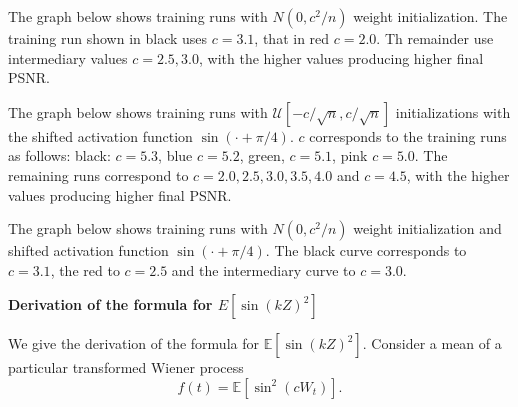 \documentclass{letter}
\begin{document}
\begin{center}

\end{center}

The graph below shows training runs with $N(0,c^2/n)$ weight initialization. The training run shown in black uses $c=3.1$, that in red $c=2.0$. Th remainder use intermediary values $c=2.5, 3.0$, with the higher values producing higher final PSNR.

\begin{center}

\end{center}

The graph below shows training runs with $\mathcal{U}[-c/\sqrt{n},c/\sqrt{n}]$ initializations with the shifted activation function $\sin(\cdot+\pi/4)$. $c$ corresponds to the training runs as follows: black: $c=5.3$, blue $c=5.2$, green, $c=5.1$, pink $c=5.0$. The remaining runs correspond to $c=2.0, 2.5, 3.0, 3.5, 4.0$ and $c=4.5$, with the higher values producing higher final PSNR.

\begin{center}

\end{center}

The graph below shows training runs with $N(0,c^2/n)$ weight initialization and shifted activation function $\sin(\cdot + \pi/4)$. The black curve corresponds to $c=3.1$, the red to $c=2.5$ and the intermediary curve to $c=3.0$.

\begin{center}

\end{center}

%


{\bf Derivation of the formula for \boldmath$E[\sin(kZ)^2]$}

We give the derivation of the formula for $\mathbb{E}[\sin(kZ)^2]$. Consider a mean of a particular transformed Wiener process $$f(t)=\mathbb{E}\left[\sin^2(cW_t)\right].$$
\end{document}

